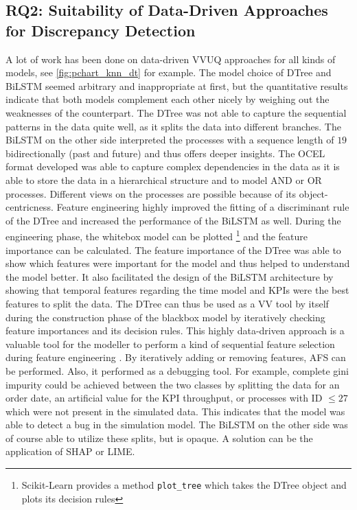 \subsection{RQ2: Suitability of Data-Driven Approaches for Discrepancy Detection}
\label{sec:discussion_rq2}
A lot of work has been done on data-driven VVUQ approaches for all kinds of models, see \autoref{fig:pchart_knn_dt} for example. The model choice of DTree and BiLSTM seemed arbitrary and inappropriate at first, but the quantitative results indicate that both models complement each other nicely by weighing out the weaknesses of the counterpart. The DTree was not able to capture the sequential patterns in the data quite well, as it splits the data into different branches. The BiLSTM on the other side interpreted the processes with a sequence length of $19$ bidirectionally (past and future) and thus offers deeper insights. The OCEL format developed was able to capture complex dependencies in the data as it is able to store the data in a hierarchical structure and to model AND or OR processes. Different views on the processes are possible because of its object-centricness. Feature engineering highly improved the fitting of a discriminant rule of the DTree and increased the performance of the BiLSTM as well. During the engineering phase, the whitebox model can be plotted \footnote{Scikit-Learn provides a method \texttt{plot\_tree} which takes the DTree object and plots its decision rules} and the feature importance can be calculated. The feature importance of the DTree was able to show which features were important for the model and thus helped to understand the model better. It also facilitated the design of the BiLSTM architecture by showing that temporal features regarding the time model and KPIs were the best features to split the data. The DTree can thus be used as a VV tool by itself during the construction phase of the blackbox model by iteratively checking feature importances and its decision rules. This highly data-driven approach is a valuable tool for the modeller to perform a kind of sequential feature selection during feature engineering \autocite{pudil1994floating}. By iteratively adding or removing features, AFS can be performed. Also, it performed as a debugging tool. For example, complete gini impurity could be achieved between the two classes by splitting the data for an order date, an artificial value for the KPI throughput, or processes with ID $\le 27$ which were not present in the simulated data. This indicates that the model was able to detect a bug in the simulation model. The BiLSTM on the other side was of course able to utilize these splits, but is opaque. A solution can be the application of SHAP or LIME.

